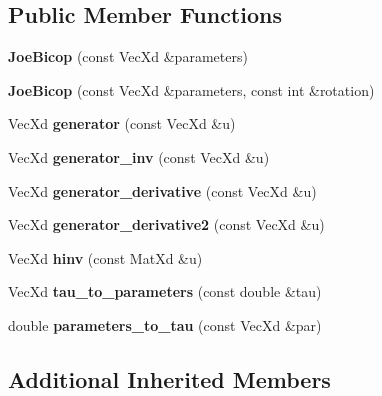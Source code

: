 \subsection*{Public Member Functions}
\begin{DoxyCompactItemize}
\item 
\hypertarget{class_joe_bicop_a15feadcf7028ba91c041c05f7033289d}{{\bfseries Joe\+Bicop} (const Vec\+Xd \&parameters)}\label{class_joe_bicop_a15feadcf7028ba91c041c05f7033289d}

\item 
\hypertarget{class_joe_bicop_aae0e184fda31ed3a78520f70d4f4102e}{{\bfseries Joe\+Bicop} (const Vec\+Xd \&parameters, const int \&rotation)}\label{class_joe_bicop_aae0e184fda31ed3a78520f70d4f4102e}

\item 
\hypertarget{class_joe_bicop_a3a9cd4684de97041f271ce1f40c32fa2}{Vec\+Xd {\bfseries generator} (const Vec\+Xd \&u)}\label{class_joe_bicop_a3a9cd4684de97041f271ce1f40c32fa2}

\item 
\hypertarget{class_joe_bicop_ad4d4ff3ee52eac61b526f10a8b12c400}{Vec\+Xd {\bfseries generator\+\_\+inv} (const Vec\+Xd \&u)}\label{class_joe_bicop_ad4d4ff3ee52eac61b526f10a8b12c400}

\item 
\hypertarget{class_joe_bicop_a9ee3b11b81ae825369fc1a82f922d480}{Vec\+Xd {\bfseries generator\+\_\+derivative} (const Vec\+Xd \&u)}\label{class_joe_bicop_a9ee3b11b81ae825369fc1a82f922d480}

\item 
\hypertarget{class_joe_bicop_a7613e4c3cd33efac94cf2d1ee7b9869d}{Vec\+Xd {\bfseries generator\+\_\+derivative2} (const Vec\+Xd \&u)}\label{class_joe_bicop_a7613e4c3cd33efac94cf2d1ee7b9869d}

\item 
\hypertarget{class_joe_bicop_a40102f50e0cd111ad75a46acdfbd80ac}{Vec\+Xd {\bfseries hinv} (const Mat\+Xd \&u)}\label{class_joe_bicop_a40102f50e0cd111ad75a46acdfbd80ac}

\item 
\hypertarget{class_joe_bicop_a213002b8d12025e0aa4a3e8d648a05d1}{Vec\+Xd {\bfseries tau\+\_\+to\+\_\+parameters} (const double \&tau)}\label{class_joe_bicop_a213002b8d12025e0aa4a3e8d648a05d1}

\item 
\hypertarget{class_joe_bicop_adbb7cf686a892146ea2a963e781593eb}{double {\bfseries parameters\+\_\+to\+\_\+tau} (const Vec\+Xd \&par)}\label{class_joe_bicop_adbb7cf686a892146ea2a963e781593eb}

\end{DoxyCompactItemize}
\subsection*{Additional Inherited Members}
